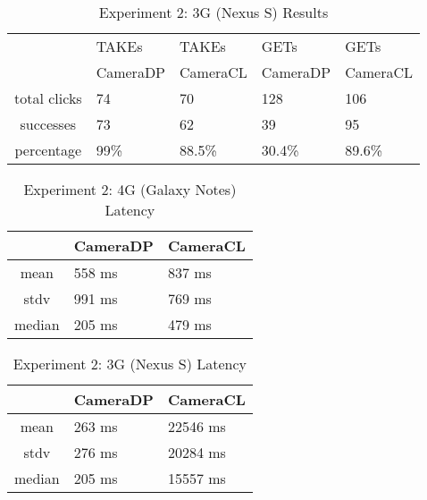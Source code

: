 \begin{table}[htb]
\begin{scriptsize} 
\caption{Experiment 2: 3G (Nexus S) Results} 
\label{table:exp-2-3g-results}
 \begin{center}
 \begin{tabular}{| c | p{1.5cm} | p{1.5cm} | p{1.5cm} | p{1.4cm} |}
  \hline
  & TAKEs & TAKEs & GETs & GETs \\
  & CameraDP & CameraCL & CameraDP & CameraCL \\
  \hline
  total clicks & 74 & 70 & 128 & 106 \\
  \hline
  successes & 73 & 62 & 39 & 95 \\
  \hline
  percentage & 99\% & 88.5\% & 30.4\% & 89.6\% \\
  \hline
  \end{tabular}
  \end{center}
\end{scriptsize}
\end{table}


\begin{table}[htb]
\begin{scriptsize} 
\caption{Experiment 2: 4G (Galaxy Notes) Latency} 
\label{table:exp-2-4g-latency-results}
 \begin{center}
 \begin{tabular}{| c | p{1.5cm} | p{1.5cm} |}
  \hline
  & CameraDP & CameraCL \\
  \hline
  mean & 558 ms & 837 ms\\
  \hline
  stdv & 991 ms & 769 ms \\
  \hline
  median & 205 ms & 479 ms\\
  \hline
  \end{tabular}
  \end{center}
\end{scriptsize}
\end{table}

\begin{table}[htb]
\begin{scriptsize} 
\caption{Experiment 2: 3G (Nexus S) Latency} 
\label{table:exp-2-3g-latency-results}
 \begin{center}
 \begin{tabular}{| c | p{1.5cm} | p{1.5cm} |}
  \hline
  & CameraDP & CameraCL \\
  \hline
  mean & 263 ms & 22546 ms \\
  \hline
  stdv & 276 ms & 20284 ms\\
  \hline
  median & 205 ms & 15557 ms\\
  \hline
  \end{tabular}
  \end{center}
\end{scriptsize}
\end{table}

